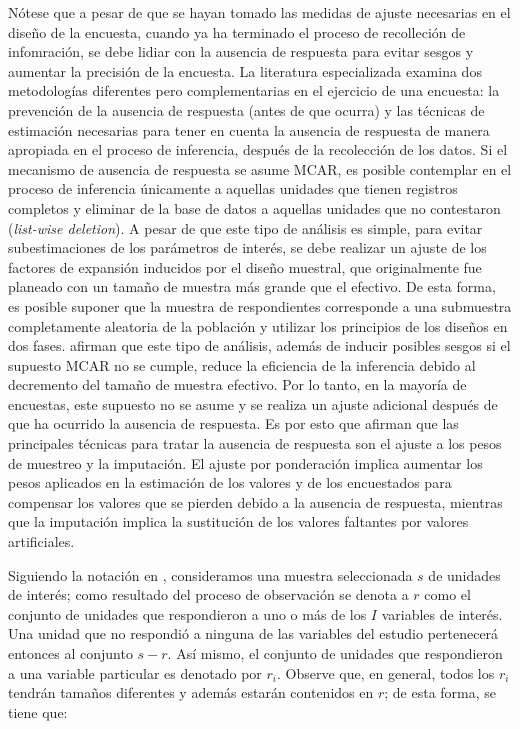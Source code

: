 Nótese que a pesar de que se hayan tomado las medidas de ajuste necesarias en el diseño de la encuesta, cuando ya ha terminado el proceso de recolleción de infomración, se debe lidiar con la ausencia de respuesta para evitar sesgos y aumentar la precisión de la encuesta. La literatura especializada examina dos metodologías diferentes pero complementarias en el ejercicio de una encuesta: la prevención de la ausencia de respuesta (antes de que ocurra) y las técnicas de estimación necesarias para tener en cuenta la ausencia de respuesta de manera apropiada en el proceso de inferencia, después de la recolección de los datos. Si el mecanismo de ausencia de respuesta se asume MCAR, es posible contemplar en el proceso de inferencia únicamente a aquellas unidades que tienen registros completos y eliminar de la base de datos a aquellas unidades que no contestaron (\emph{list-wise deletion}). A pesar de que este tipo de análisis es simple, para evitar subestimaciones de los parámetros de interés, se debe realizar un ajuste de los factores de expansión inducidos por el diseño muestral, que originalmente fue planeado con un tamaño de muestra más grande que el efectivo. De esta forma, es posible suponer que la muestra de respondientes corresponde a una submuestra completamente aleatoria de la población y utilizar los principios de los diseños en dos fases. \citet[capítulo 11]{Heeringa_West_Berglund_2010} afirman que este tipo de análisis, además de inducir posibles sesgos si el supuesto MCAR no se cumple, reduce la eficiencia de la inferencia debido al decremento del tamaño de muestra efectivo. Por lo tanto, en la mayoría de encuestas, este supuesto no se asume y se realiza un ajuste adicional después de que ha ocurrido la ausencia de respuesta. Es por esto que \citet[sección 15.5]{Sarndal_Swensson_Wretman_2003} afirman que las principales técnicas para tratar la ausencia de respuesta son el ajuste a los pesos de muestreo y la imputación. El ajuste por ponderación implica aumentar los pesos aplicados en la estimación de los valores y de los encuestados para compensar los valores que se pierden debido a la ausencia de respuesta, mientras que la imputación implica la sustitución de los valores faltantes por valores artificiales.

Siguiendo la notación en \citet{Sarndal_Lundstrom_2006}, consideramos una muestra seleccionada \(s\) de unidades de interés; como resultado del proceso de observación se denota a \(r\) como el conjunto de unidades que respondieron a uno o más de los \(I\) variables de interés. Una unidad que no respondió a ninguna de las variables del estudio pertenecerá entonces al conjunto \(s−r\). Así mismo, el conjunto de unidades que respondieron a una variable particular es denotado por \(r_i\). Observe que, en general, todos los \(r_i\) tendrán tamaños diferentes y además estarán contenidos en \(r\); de esta forma, se tiene que:

